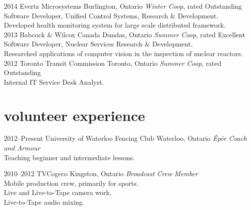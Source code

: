\documentclass[]{eliot-cv} %
\begin{document}
\begin{entrylist}

\entry
{2014}
{Evertz Microsystems}
{Burlington, Ontario}
{\emph{Winter Co\-op}, rated Outstanding \\
Software Developer, Unified Control Systems, Research \& Development. \\
Developed health monitoring system for large scale distributed framework. \\}
\entry
{2013}
{Babcock \& Wilcox Canada}
{Dundas, Ontario}
{\emph{Summer Co\-op}, rated Excellent \\
Software Developer, Nuclear Services Research \& Development. \\
Researched applications of computer vision in the inspection of nuclear reactors. \\}
\entry
{2012}
{Toronto Transit Commission}
{Toronto, Ontario}
{\emph{Summer Co\-op}, rated Outstanding \\
Internal IT Service Desk Analyst.}

\end{entrylist}

\section{volunteer experience}

\begin{entrylist}

\entry
{2012--Present}
{University of Waterloo Fencing Club}
{Waterloo, Ontario}
{\emph{\'{E}p\'{e}e Coach and Armour} \\
Teaching beginner and intermediate lessons. \\}

\entry
{2010--2012}
{TVCogeco}
{Kingston, Ontario}
{\emph{Broadcast Crew Member} \\
Mobile production crew, primarily for sports. \\
Live and Live-to-Tape camera work. \\
Live-to-Tape audio mixing.}
\end{entrylist}
\end{document}

